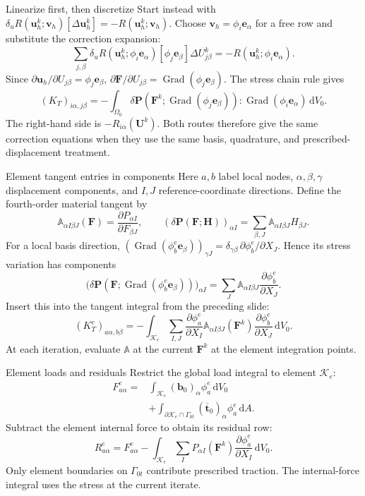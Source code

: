 \documentclass[11pt,aspectratio=169]{beamer}
\newcommand{\bu}{\bm u}
\newcommand{\bv}{\bm v}
\newcommand{\bF}{\bm F}
\newcommand{\bP}{\bm P}
\newcommand{\bb}{\bm b}
\newcommand{\bt}{\bm t}
\newcommand{\bU}{\bm U}
\newcommand{\Grad}{\operatorname{Grad}}
\begin{document}
\begin{frame}{Linearize first, then discretize}
Start instead with
$\delta_uR(\bu_h^k;\bv_h)[\Delta\bu_h^k]=-R(\bu_h^k;\bv_h)$.
Choose $\bv_h=\phi_i\bm e_\alpha$ for a free row and substitute the
correction expansion:
\[
\sum_{j,\beta}
\delta_uR(\bu_h^k;\phi_i\bm e_\alpha)[\phi_j\bm e_\beta]
\Delta U_{j\beta}^k
=-R(\bu_h^k;\phi_i\bm e_\alpha).
\]
Since $\partial\bu_h/\partial U_{j\beta}=\phi_j\bm e_\beta$,
$\partial\bF/\partial U_{j\beta}=\Grad(\phi_j\bm e_\beta)$.
The stress chain rule gives
\[
\boxed{(K_T)_{i\alpha,j\beta}
=-\int_{\Omega_0}\delta\bP(\bF^k;\Grad(\phi_j\bm e_\beta)):\Grad(\phi_i\bm e_\alpha)\,\mathrm dV_0.}
\]
The right-hand side is $-R_{i\alpha}(\bU^k)$.
Both routes therefore give the same correction equations when they use
the same basis, quadrature, and prescribed-displacement treatment.
\end{frame}

\begin{frame}{Element tangent entries in components}
Here $a,b$ label local nodes, $\alpha,\beta,\gamma$ displacement components,
and $I,J$ reference-coordinate directions.
Define the fourth-order material tangent by
\[
\mathbb A_{\alpha I\beta J}(\bF)
=\frac{\partial P_{\alpha I}}{\partial F_{\beta J}},
\qquad
(\delta\bP(\bF;\bm H))_{\alpha I}
=\sum_{\beta,J}\mathbb A_{\alpha I\beta J}H_{\beta J}.
\]
For a local basis direction,
$(\Grad(\phi_b^e\bm e_\beta))_{\gamma J}
=\delta_{\gamma\beta}\,\partial\phi_b^e/\partial X_J$.
Hence its stress variation has components
\[
\bigl(\delta\bP(\bF;\Grad(\phi_b^e\bm e_\beta))\bigr)_{\alpha I}
=\sum_J\mathbb A_{\alpha I\beta J}
\frac{\partial\phi_b^e}{\partial X_J}.
\]
Insert this into the tangent integral from the preceding slide:
\[
\boxed{(K_T^e)_{a\alpha,b\beta}
=-\int_{\mathcal K_e}\sum_{I,J}
\frac{\partial\phi_a^e}{\partial X_I}
\mathbb A_{\alpha I\beta J}(\bF^k)
\frac{\partial\phi_b^e}{\partial X_J}\,\mathrm dV_0.}
\]
At each iteration, evaluate $\mathbb A$ at the current $\bF^k$ at the
element integration points.
\end{frame}

\begin{frame}{Element loads and residuals}
Restrict the global load integral to element $\mathcal K_e$:
\[
\begin{aligned}
F^e_{a\alpha}
={}&\int_{\mathcal K_e}(\bb_0)_\alpha\phi_a^e\,\mathrm dV_0\\
&+\int_{\partial\mathcal K_e\cap\Gamma_{0t}}
(\overline{\bt}_0)_\alpha\phi_a^e\,\mathrm dA.
\end{aligned}
\]
Subtract the element internal force to obtain its residual row:
\[
R^e_{a\alpha}
=F^e_{a\alpha}-\int_{\mathcal K_e}\sum_I P_{\alpha I}(\bF^k)
\frac{\partial\phi_a^e}{\partial X_I}\,\mathrm dV_0.
\]
Only element boundaries on $\Gamma_{0t}$ contribute prescribed traction.
The internal-force integral uses the stress at the current iterate.
\end{frame}
\end{document}
